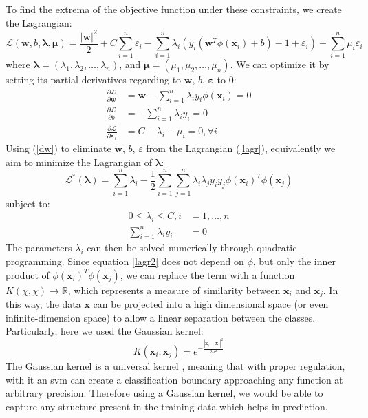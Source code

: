 To find the extrema of the objective function under these constraints, we create the Lagrangian:
\begin{equation} \label{lagr}
    \mathcal{L}(\mathbf{w}, b, \mathbf{\lambda}, \mathbf{\mu})=\frac{|\mathbf{w}|^2}{2} + C\sum_{i=1}^n\varepsilon_i - \sum_{i=1}^n \lambda_i(y_i(\mathbf{w}^T\phi(\mathbf{x}_i) + b) - 1 + \varepsilon_i) - \sum_{i=1}^n \mu_i\varepsilon_i
\end{equation}
where $\mathbf{\lambda}=(\lambda_1, \lambda_2, \ldots, \lambda_n)$, and $\mathbf{\mu}=(\mu_1, \mu_2, \ldots, \mu_n)$. We can optimize it by setting its partial derivatives regarding to $\mathbf{w}$, $b$, $\mathbf{\varepsilon}$ to 0:
\begin{align}\label{dw}
    \frac{\partial\mathcal{L}}{\partial\mathbf{w}} &= \mathbf{w} - \sum_{i=1}^n \lambda_i  y_i  \phi(\mathbf{x}_i) = 0 \nonumber\\ 
    \frac{\partial\mathcal{L}}{\partial{b}} &= - \sum_{i=1}^n \lambda_i y_i = 0 \\
    \frac{\partial\mathcal{L}}{\partial{\mathbf{\varepsilon}_i}} &= C - \lambda_i - \mu_i = 0, \forall i  \nonumber 
\end{align}
Using (\ref{dw}) to eliminate $\mathbf{w}$, $b$, $\varepsilon$ from the Lagrangian (\ref{lagr}), equivalently we aim to minimize the Lagrangian of $\mathbf{\lambda}$:
\begin{equation} \label{lagr2}
    \mathcal{L}^*(\mathbf{\lambda}) = \sum_{i=1}^{n} \lambda_i - \frac{1}{2}\sum_{i=1}^n \sum_{j=1}^n \lambda_i \lambda_j y_i y_j \phi(\mathbf{x}_i)^T\phi(\mathbf{x}_j)
\end{equation}
subject to:
\begin{align*}
    0 \leq \lambda_i \leq C, i &= 1,\ldots,n \\
    \sum_{i=1}^n \lambda_i y_i &= 0
\end{align*}
The parameters $\lambda_i$ can then be solved numerically through quadratic programming. Since equation \ref{lagr2} does not depend on $\phi$, but only the inner product of $\phi(\mathbf{x}_i)^T\phi(\mathbf{x}_j)$, we can replace the term with a function $K(\chi, \chi) \to \mathbb{R}$, which represents a measure of similarity between $\mathbf{x}_i$ and $ \mathbf{x}_j$. In this way, the data $\mathbf{x}$ can be projected into a high dimensional space (or even infinite-dimension space) to allow a linear separation between the classes. Particularly, here we used the Gaussian kernel:
\begin{equation*}
    K(\mathbf{x}_i, \mathbf{x}_j) = e^{-\frac{|\mathbf{x}_i - \mathbf{x}_j|^2}{2\sigma^2}}
\end{equation*}
The Gaussian kernel is a universal kernel \citep{park91}, meaning that with proper regulation, with it an \gls{svm} can create a classification boundary approaching any function at arbitrary precision. Therefore using a Gaussian kernel, we would be able to capture any structure present in the training data which helps in prediction.


